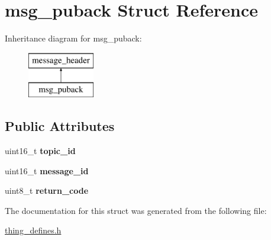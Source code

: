\hypertarget{structmsg__puback}{\section{msg\-\_\-puback Struct Reference}
\label{structmsg__puback}
}
Inheritance diagram for msg\-\_\-puback\-:\begin{figure}[H]
\begin{center}
\leavevmode
\includegraphics[height=2.000000cm]{structmsg__puback}
\end{center}
\end{figure}
\subsection*{Public Attributes}
\begin{DoxyCompactItemize}
\item 
\hypertarget{structmsg__puback_aaee5d68fe5a9286fe293f0081f2c446c}{uint16\-\_\-t {\bfseries topic\-\_\-id}}\label{structmsg__puback_aaee5d68fe5a9286fe293f0081f2c446c}

\item 
\hypertarget{structmsg__puback_a8524df10b62eaa70ad043971fba54370}{uint16\-\_\-t {\bfseries message\-\_\-id}}\label{structmsg__puback_a8524df10b62eaa70ad043971fba54370}

\item 
\hypertarget{structmsg__puback_a3645248497ed231a2404b78df4798d6d}{uint8\-\_\-t {\bfseries return\-\_\-code}}\label{structmsg__puback_a3645248497ed231a2404b78df4798d6d}

\end{DoxyCompactItemize}


The documentation for this struct was generated from the following file\-:\begin{DoxyCompactItemize}
\item 
\hyperlink{thing__defines_8h}{thing\-\_\-defines.\-h}\end{DoxyCompactItemize}

